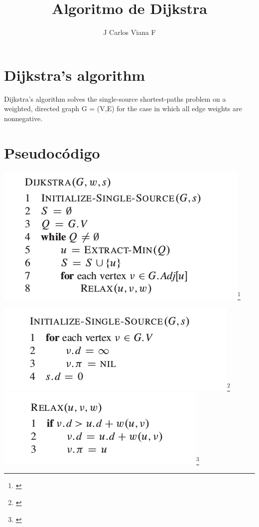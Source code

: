 \documentclass[aspectratio=169]{beamer}
\title{Algoritmo de Dijkstra}
\author{J Carlos Viana F}
\begin{document}
\frame{\titlepage}

\section{Dijkstra’s algorithm}

\begin{frame}
\cite[p. 658]{Cormen}
Dijkstra’s algorithm solves the single-source shortest-paths problem on a weighted,
directed graph G = (V,E) for the case in which all edge weights are nonnegative.
\end{frame}

\section{Pseudocódigo}

\begin{frame}
\includegraphics[scale=0.5]{cormen01.png}\footnote{\cite[p. 658]{Cormen}}
\end{frame}

\begin{frame}
\includegraphics[scale=0.5]{cormen02.png}\footnote{\cite[p. 648]{Cormen}}
\includegraphics[scale=0.5]{cormen03.png}\footnote{\cite[p. 649]{Cormen}}
\end{frame}
\end{document}

